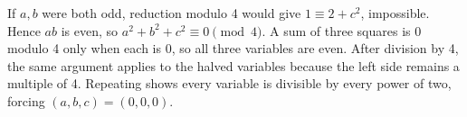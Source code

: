 If $a,b$ were both odd, reduction modulo 4 would give $1\equiv2+c^2$, impossible. Hence $ab$ is even, so $a^2+b^2+c^2\equiv0\pmod4$. A sum of three squares is 0 modulo 4 only when each is 0, so all three variables are even. After division by 4, the same argument applies to the halved variables because the left side remains a multiple of 4. Repeating shows every variable is divisible by every power of two, forcing $\boxed{(a,b,c)=(0,0,0)}$.
